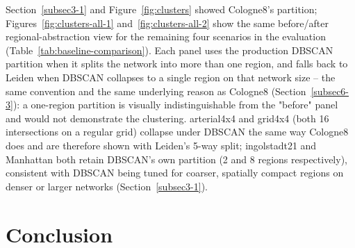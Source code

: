 \documentclass[3p,times]{elsarticle}
\theoremstyle{plain}
\theoremstyle{definition}
\begin{document}
Section~\ref{subsec3-1} and Figure~\ref{fig:clusters} showed Cologne8's
partition; Figures~\ref{fig:clusters-all-1} and~\ref{fig:clusters-all-2}
show the same before/after regional-abstraction view for the
remaining four scenarios in the evaluation
(Table~\ref{tab:baseline-comparison}). Each panel uses
the production DBSCAN partition when it splits the network into more
than one region, and falls back to Leiden when DBSCAN collapses to a
single region on that network size -- the same convention and the same
underlying reason as Cologne8 (Section~\ref{subsec6-3}): a one-region
partition is visually indistinguishable from the "before" panel and
would not demonstrate the clustering. arterial4x4 and grid4x4 (both
16 intersections on a regular grid) collapse under DBSCAN the same way
Cologne8 does and are therefore shown with Leiden's 5-way split;
ingolstadt21 and Manhattan both retain DBSCAN's own partition (2 and 8
regions respectively), consistent with DBSCAN being tuned for coarser,
spatially compact regions on denser or larger networks
(Section~\ref{subsec3-1}).


\section{Conclusion}\label{sec7}
\end{document}
